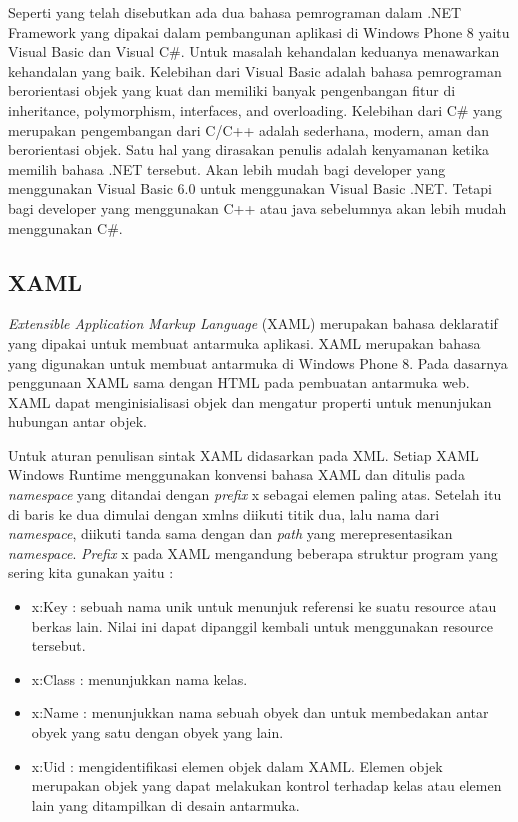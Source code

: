 Seperti yang telah disebutkan ada dua bahasa pemrograman dalam .NET Framework yang dipakai dalam pembangunan aplikasi di Windows Phone 8 yaitu Visual Basic dan Visual C\#. \newline Untuk masalah kehandalan keduanya menawarkan kehandalan yang baik. Kelebihan dari Visual Basic adalah bahasa pemrograman berorientasi objek yang kuat dan memiliki banyak pengenbangan fitur di inheritance, polymorphism, interfaces, and overloading\cite{MSDN}. Kelebihan dari C\# yang merupakan pengembangan dari C/C++ adalah sederhana, modern, aman dan berorientasi objek\cite{MSDN}. Satu hal yang dirasakan penulis adalah kenyamanan ketika memilih bahasa .NET tersebut. Akan lebih mudah bagi developer yang menggunakan Visual Basic 6.0  untuk menggunakan Visual \newline Basic .NET. Tetapi bagi  developer yang menggunakan C++ atau java sebelumnya akan lebih mudah menggunakan C\#.

\subsection{XAML}
\label{subsec:XAML}
\hspace{0.5cm} \textit{Extensible Application Markup Language} (XAML) merupakan bahasa deklaratif yang dipakai untuk membuat antarmuka aplikasi. XAML merupakan bahasa yang digunakan untuk membuat antarmuka di Windows Phone 8\cite{Manning}. Pada dasarnya penggunaan XAML sama dengan HTML pada pembuatan antarmuka web. XAML dapat menginisialisasi objek dan mengatur properti untuk menunjukan hubungan antar objek.

Untuk aturan penulisan sintak XAML didasarkan pada XML. Setiap XAML Windows Runtime menggunakan konvensi bahasa XAML dan ditulis pada \textit{namespace} yang ditandai dengan \textit{prefix} x sebagai elemen paling atas. Setelah itu di baris ke dua dimulai dengan xmlns diikuti titik dua, lalu nama dari \textit{namespace}, diikuti tanda sama dengan dan \textit{path} yang merepresentasikan \textit{namespace}.
\textit{Prefix} x pada XAML mengandung beberapa struktur program yang sering kita gunakan yaitu :
\begin{itemize}
	\item x:Key : sebuah nama unik untuk menunjuk referensi ke suatu resource atau berkas lain. Nilai ini dapat dipanggil kembali untuk menggunakan resource tersebut.
	\item x:Class : menunjukkan nama kelas.
	\item x:Name : menunjukkan nama sebuah obyek dan untuk membedakan antar obyek yang satu dengan obyek yang lain.
	\item x:Uid : mengidentifikasi elemen objek dalam XAML. Elemen objek merupakan objek yang dapat melakukan kontrol terhadap kelas atau elemen lain yang ditampilkan di desain antarmuka.
\end{itemize}	

